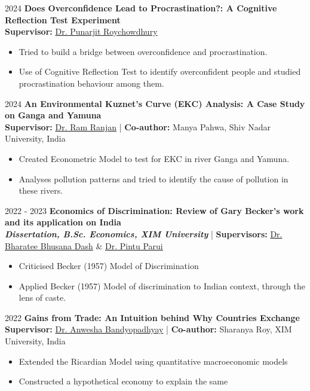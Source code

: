 \datedsubsection{ }
	{%
		2024}
	{%
		\textbf{Does Overconfidence Lead to Procrastination?: A Cognitive Reflection Test Experiment}
    } \\
    \textbf{Supervisor:} \href{https://punarjitroyc.weebly.com}{Dr. Punarjit Roychowdhury}
    \begin{itemize}
        \item Tried to build a bridge between overconfidence and procrastination.
        \item Use of Cognitive Reflection Test to identify overconfident people and studied procrastination behaviour among them.
    \end{itemize}
\vspace{-0.4em}
\datedsubsection{ }
	{%
		2024}
	{%
		\textbf{An Environmental Kuznet’s Curve (EKC) Analysis: A Case Study on Ganga and Yamuna }
    } \\
    \textbf{Supervisor:} \href{https://snu.edu.in/faculty/ram-ranjan/}{Dr. Ram Ranjan} | \textbf{Co-author:} Manya Pahwa, Shiv Nadar University, India
    \begin{itemize}
        \item Created Econometric Model to test for EKC in river Ganga and Yamuna.
        \item  Analyses pollution patterns and tried to identify the cause of pollution in these rivers.
    \end{itemize}
\vspace{-0.4em}
\datedsubsection{ }
	{%
		2022 - 2023}
	{%
		\textbf{Economics of Discrimination: Review of Gary Becker’s work and its application on India}
    } \\
    \textbf{\textit{Dissertation, B.Sc. Economics, XIM University}} |
    \textbf{Supervisors:} \href{http://jnu.ac.in/content/bharateedash}{Dr. Bharatee Bhusana Dash} \& \href{https://www.economics.iitb.ac.in/pintu.html}{Dr. Pintu Parui}
    \begin{itemize}
        \item Criticised Becker (1957) Model of Discrimination
        \item Applied Becker (1957) Model of discrimination to Indian context, through the lens of caste.
    \end{itemize}
\vspace{-0.4em}
\datedsubsection{ }
	{%
		2022}
	{%
		\textbf{Gains from Trade: An Intuition behind Why Countries Exchange}
    } \\
    \textbf{Supervisor:} \href{https://sites.google.com/view/anweshabandyopadhyay/home}{Dr. Anwesha Bandyopadhyay}  | \textbf{Co-author:} Sharanya Roy, XIM University, India
    \begin{itemize}
        \item  Extended the Ricardian Model using quantitative macroeconomic models
        \item Constructed a hypothetical economy to explain the same
    \end{itemize}

